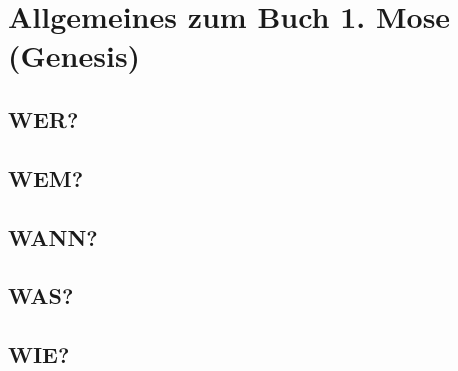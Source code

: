 
\section{Allgemeines zum Buch 1. Mose (Genesis)}
\subsection{WER?}

\subsection{WEM?}

\subsection{WANN?}

\subsection{WAS?}

\subsection{WIE?}

%
%
%
%
%
%
%
%
%
%




